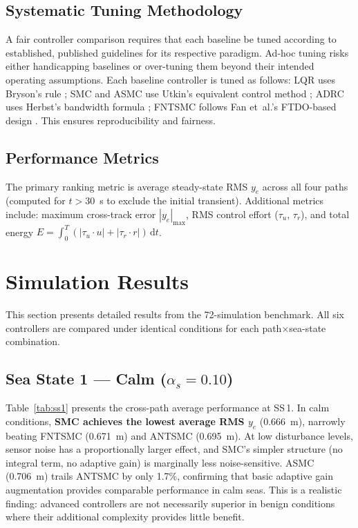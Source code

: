 \documentclass[review]{cas-dc}
\begin{document}
\subsection{Systematic Tuning Methodology}

A fair controller comparison requires that each baseline be tuned according to established, published guidelines for its respective paradigm. Ad-hoc tuning risks either handicapping baselines or over-tuning them beyond their intended operating assumptions. Each baseline controller is tuned as follows: LQR uses Bryson's rule \citep{Bryson1975}; SMC and ASMC use Utkin's equivalent control method \citep{Utkin2009}; ADRC uses Herbst's bandwidth formula \citep{Herbst2013}; FNTSMC follows Fan et~al.'s FTDO-based design \citep{Fan2021}. This ensures reproducibility and fairness.

\subsection{Performance Metrics}

The primary ranking metric is average steady-state RMS $y_e$ across all four paths (computed for $t > 30$~s to exclude the initial transient). Additional metrics include: maximum cross-track error $|y_e|_{\max}$, RMS control effort ($\tau_u$, $\tau_r$), and total energy $E = \int_0^T(|\tau_u \cdot u| + |\tau_r \cdot r|)\,\mathrm{d}t$.


\section{Simulation Results}
\label{sec:results}

This section presents detailed results from the 72-simulation benchmark. All six controllers are compared under identical conditions for each path$\times$sea-state combination.

\subsection{Sea State 1 --- Calm ($\alpha_s = 0.10$)}

Table~\ref{tab:ss1} presents the cross-path average performance at SS\,1. In calm conditions, \textbf{SMC achieves the lowest average RMS $y_e$} (0.666~m), narrowly beating FNTSMC (0.671~m) and ANTSMC (0.695~m). At low disturbance levels, sensor noise has a proportionally larger effect, and SMC's simpler structure (no integral term, no adaptive gain) is marginally less noise-sensitive. ASMC (0.706~m) trails ANTSMC by only 1.7\%, confirming that basic adaptive gain augmentation provides comparable performance in calm seas. This is a realistic finding: advanced controllers are not necessarily superior in benign conditions where their additional complexity provides little benefit.
\end{document}
